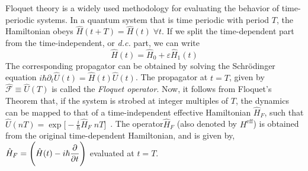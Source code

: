 \documentclass[12pt]{iopart}
\begin{document}
Floquet theory is a widely used methodology for evaluating the behavior of time-periodic systems.  In a quantum system that is time periodic with period $T$, the Hamiltonian obeys $\hat{H}(t+T) = \hat{H}(t)\;\forall t$. If we split the time-dependent part from the time-independent, or \textit{d.c.} part, we can write
\begin{equation*}
    \hat{H}(t) = \hat{H}_0 + \varepsilon \hat{H}_1(t)
\end{equation*}
The corresponding propagator can be obtained by solving the Schr\"odinger equation $\displaystyle{i\hbar \partial_t \hat{U}(t) = \hat{H}(t) \hat{U}(t)}$.  The propagator at $t=T$, given by $ \hat{\mathcal{F}}\equiv \hat{U}(T)$ is called the \textit{Floquet operator}. Now, it follows from Floquet's Theorem that, if the system is strobed at integer multiples of $T$, the dynamics can be mapped to that of a time-independent effective Hamiltonian $\hat{H}_F$, such that  $\displaystyle\hat{U}(nT) = \exp\bigg[-\frac{i}{\hbar}\hat{H}_F\; nT \bigg]$~\cite{Eckardt_2015}.  The operator$\hat{H}_F$ (also denoted by $H^\mathrm{eff}$) is obtained from the original time-dependent Hamiltonian, and is given by, $\displaystyle \hat{H}_F = \Bigg(\hat{H}(t) - i\hbar \pdv{t}\Bigg)$ evaluated at $t=T$. 
\end{document}

